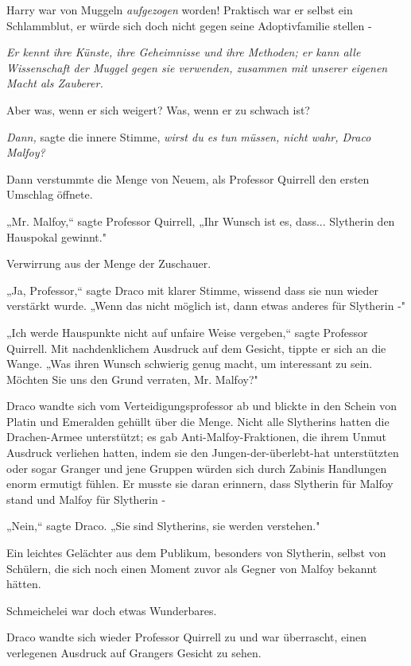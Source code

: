 {Harry war von Muggeln \emph{aufgezogen} worden! Praktisch war er selbst ein Schlammblut, er würde sich doch nicht gegen seine Adoptivfamilie stellen -

\emph{Er kennt ihre Künste, ihre Geheimnisse und ihre Methoden; er kann alle Wissenschaft der Muggel gegen sie verwenden, zusammen mit unserer eigenen Macht als Zauberer.}

Aber was, wenn er sich weigert? Was, wenn er zu schwach ist?

\emph{Dann,} sagte die innere Stimme, \emph{wirst du es} \emph{tun} \emph{müssen, nicht wahr, Draco Malfoy?}

Dann verstummte die Menge von Neuem, als Professor Quirrell den ersten Umschlag öffnete.

„Mr. Malfoy,“ sagte Professor Quirrell, „Ihr Wunsch ist es, dass... Slytherin den Hauspokal gewinnt."

Verwirrung aus der Menge der Zuschauer.

„Ja, Professor,“ sagte Draco mit klarer Stimme, wissend dass sie nun wieder verstärkt wurde. „Wenn das nicht möglich ist, dann etwas anderes für Slytherin -"

„Ich werde Hauspunkte nicht auf unfaire Weise vergeben,“ sagte Professor Quirrell. Mit nachdenklichem Ausdruck auf dem Gesicht, tippte er sich an die Wange. „Was ihren Wunsch schwierig genug macht, um interessant zu sein. Möchten Sie uns den Grund verraten, Mr. Malfoy?"

Draco wandte sich vom Verteidigungsprofessor ab und blickte in den Schein von Platin und Emeralden gehüllt über die Menge. Nicht alle Slytherins hatten die Drachen-Armee unterstützt; es gab Anti-Malfoy-Fraktionen, die ihrem Unmut Ausdruck verliehen hatten, indem sie den Jungen-der-überlebt-hat unterstützten oder sogar Granger und jene Gruppen würden sich durch Zabinis Handlungen enorm ermutigt fühlen. Er musste sie daran erinnern, dass Slytherin für Malfoy stand und Malfoy für Slytherin -

„Nein,“ sagte Draco. „Sie sind Slytherins, sie werden verstehen."

Ein leichtes Gelächter aus dem Publikum, besonders von Slytherin, selbst von Schülern, die sich noch einen Moment zuvor als Gegner von Malfoy bekannt hätten.

Schmeichelei war doch etwas Wunderbares.

Draco wandte sich wieder Professor Quirrell zu und war überrascht, einen verlegenen Ausdruck auf Grangers Gesicht zu sehen.

}
